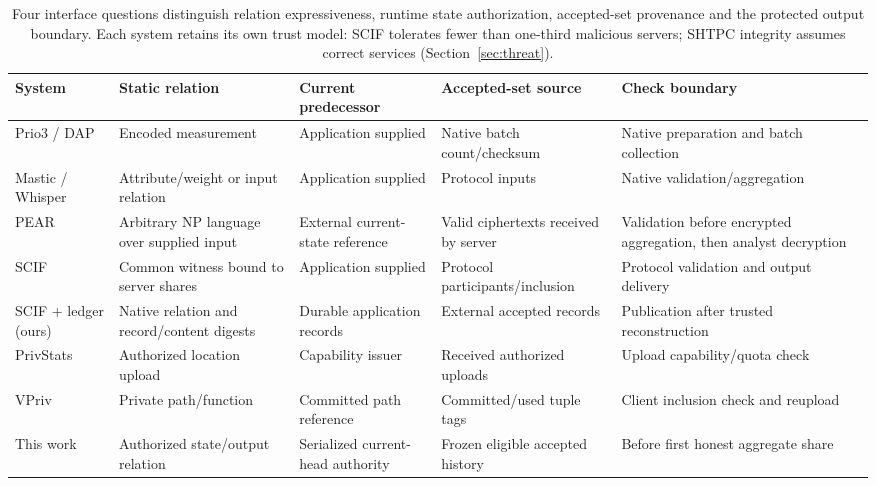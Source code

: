 \begin{table}[t]
\centering
\caption{Four interface questions distinguish relation expressiveness, runtime
state authorization, accepted-set provenance and the protected output boundary.
Each system retains its own trust model: SCIF tolerates fewer than one-third
malicious servers; SHTPC integrity assumes correct services
(Section~\ref{sec:threat}).}
\label{tab:closest-work}
\footnotesize
\begin{tabularx}{\textwidth}{@{}lYYYY@{}}
\toprule
System & Static relation & Current predecessor & Accepted-set source & Check boundary \\
\midrule
Prio3 / DAP~\cite{Barnes2023VDAF08,Geoghegan2026DAP} & Encoded measurement & Application supplied & Native batch count/checksum & Native preparation and batch collection \\
Mastic / Whisper~\cite{Mouris2025Mastic,Rathee2024Whisper} & Attribute/weight or input relation & Application supplied & Protocol inputs & Native validation/aggregation \\
PEAR~\cite{Acharya2025PEAR} & Arbitrary NP language over supplied input & External current-state reference & Valid ciphertexts received by server & Validation before encrypted aggregation, then analyst decryption \\
SCIF~\cite{Su2025SCIF} & Common witness bound to server shares & Application supplied & Protocol participants/inclusion & Protocol validation and output delivery \\
SCIF + ledger (ours) & Native relation and record/content digests & Durable application records & External accepted records & Publication after trusted reconstruction \\
PrivStats~\cite{Popa2011PrivStats} & Authorized location upload & Capability issuer & Received authorized uploads & Upload capability/quota check \\
VPriv~\cite{Popa2009VPriv} & Private path/function & Committed path reference & Committed/used tuple tags & Client inclusion check and reupload \\
This work & Authorized state/output relation & Serialized current-head authority & Frozen eligible accepted history & Before first honest aggregate share \\
\bottomrule
\end{tabularx}
\end{table}
